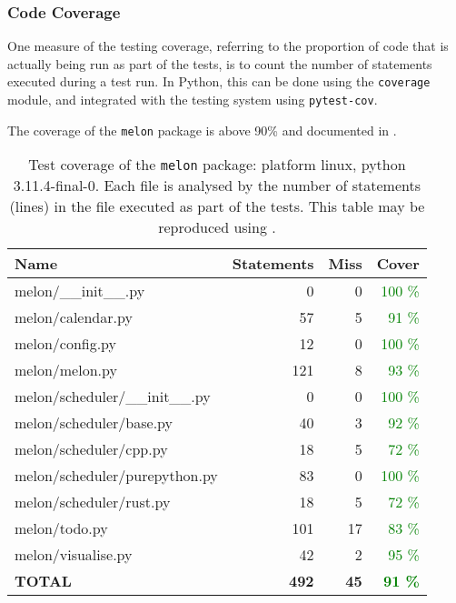 \subsubsection{Code Coverage}
One measure of the testing coverage, referring to the proportion of code that is actually being run as part of the tests, is to count the number of statements executed during a test run.
In Python, this can be done using the \texttt{coverage} module, and integrated with the testing system using \texttt{pytest-cov}.

The coverage of the \texttt{melon} package is above 90\% and documented in .

\begin{table}[H]
  \centering
  \caption{Test coverage of the \texttt{melon} package: platform linux, python 3.11.4-final-0. Each file is analysed by the number of statements (lines) in the file executed as part of the tests. This table may be reproduced using .}
  \begin{tabular}{lrrr}
    \hline
    \bf Name                        & \bf Statements & \bf Miss & \bf Cover                    \\
    \hline
    melon/\_\_init\_\_.py           & 0              & 0        & \textcolor{green}{100 \%}    \\
    melon/calendar.py               & 57             & 5        & \textcolor{green}{91 \%}     \\
    melon/config.py                 & 12             & 0        & \textcolor{green}{100 \%}    \\
    melon/melon.py                  & 121            & 8        & \textcolor{green}{93 \%}     \\
    melon/scheduler/\_\_init\_\_.py & 0              & 0        & \textcolor{green}{100 \%}    \\
    melon/scheduler/base.py         & 40             & 3        & \textcolor{green}{92 \%}     \\
    melon/scheduler/cpp.py          & 18             & 5        & \textcolor{green}{72 \%}     \\
    melon/scheduler/purepython.py   & 83             & 0        & \textcolor{green}{100 \%}    \\
    melon/scheduler/rust.py         & 18             & 5        & \textcolor{green}{72 \%}     \\
    melon/todo.py                   & 101            & 17       & \textcolor{green}{83 \%}     \\
    melon/visualise.py              & 42             & 2        & \textcolor{green}{95 \%}     \\
    \hline
    \bf TOTAL                       & \bf 492        & \bf 45   & \bf \textcolor{green}{91 \%}
  \end{tabular}
  \label{table:coverage}
\end{table}

